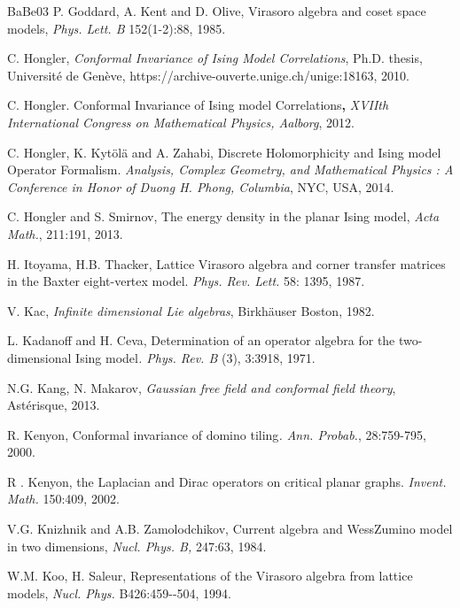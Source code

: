 \documentclass[12pt,oneside,english]{amsart}
\numberwithin{equation}{section}
\numberwithin{figure}{section}
\theoremstyle{plain}
\theoremstyle{plain}
\theoremstyle{plain}
\theoremstyle{plain}
\theoremstyle{remark}
\theoremstyle{definition}
\theoremstyle{plain}
\theoremstyle{plain}
\numberwithin{thm}{section}
\begin{document}
\begin{thebibliography}{BaBe03}
P. Goddard, A. Kent and D. Olive,
Virasoro algebra and coset space models, \emph{Phys. Lett. B} 
152(1-2):88,
1985.

C. Hongler, \emph{Conformal Invariance of
Ising Model Correlations}, Ph.D. thesis, Universit\'e de Genève, 
https://archive-ouverte.unige.ch/unige:18163,
2010.

C. Hongler. Conformal Invariance of Ising
model Correlations\textbf{, }\emph{XVIIth International Congress on
Mathematical Physics, Aalborg}, 2012.

C. Hongler, K. Kyt\"ol\"a and A.
Zahabi, Discrete Holomorphicity and Ising model Operator Formalism.
\emph{Analysis, Complex Geometry, and Mathematical Physics : A Conference
in Honor of Duong H. Phong, Columbia}, NYC, USA, 2014.

C. Hongler and S. Smirnov, The energy
density in the planar Ising model, \emph{Acta Math.}, 211:191,
2013.

H. Itoyama, H.B. Thacker, Lattice
Virasoro algebra and corner transfer matrices in the Baxter eight-vertex
model. \emph{Phys. Rev. Lett.} 58: 1395, 1987.

V. Kac, \emph{Infinite dimensional Lie algebras},
Birkh\"auser Boston, 1982.

L. Kadanoff and H. Ceva, Determination
of an operator algebra for the two-dimensional Ising model\emph{.
Phys. Rev. B} (3), 3:3918, 1971.

N.G. Kang, N. Makarov, \emph{Gaussian
free field and conformal field theory}, Ast\'erisque, 2013.

R. Kenyon, Conformal invariance of domino
tiling\emph{. Ann. Probab.}, 28:759-795, 2000.

R . Kenyon, the Laplacian and Dirac operators
on critical planar graphs. \emph{Invent. Math.} 150:409,
2002.

V.G. Knizhnik and A.B. Zamolodchikov,
Current algebra and Wess\textendash Zumino model in two dimensions,
\emph{Nucl. Phys. B,} 247:63, 1984.

W.M. Koo, H. Saleur, Representations
of the Virasoro algebra from lattice models, \emph{Nucl. Phys.} B426:459-{}-504,
1994.


\end{thebibliography}
\end{document}
